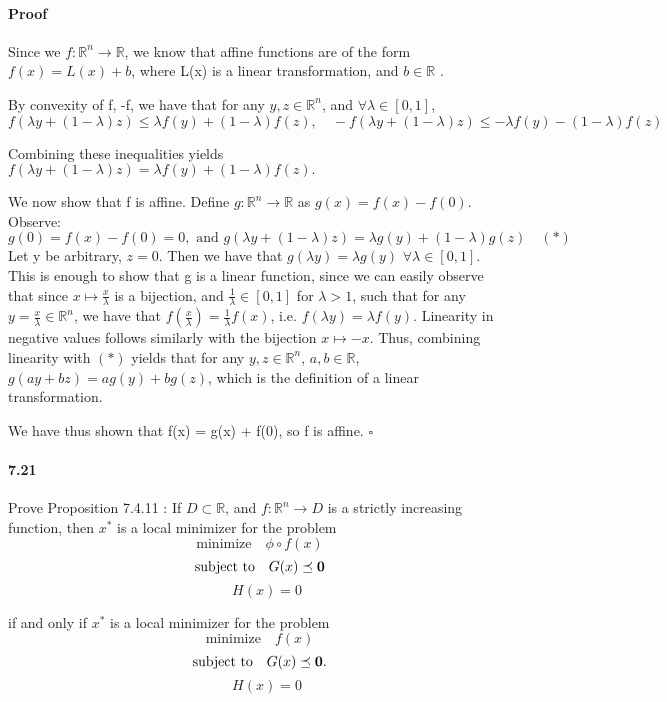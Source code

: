 \documentclass[letterpaper,12pt]{article}
\theoremstyle{definition}
\begin{document}
\paragraph{Proof} Since we $f: \mathbb{R}^n \rightarrow \mathbb{R}$, we know that affine functions are of the form $f(x) = L(x) + b $, where L(x) is a linear transformation, and $ b \in \mathbb{R}$ .

By convexity of f, -f, we have that for any $y, z \in \mathbb{R}^n$, and $\forall \lambda \in [0,1]$,  $$f(\lambda y + (1 - \lambda) z) \le \lambda f(y) + (1 - \lambda) f(z), \quad -f(\lambda y + (1 - \lambda) z) \le -\lambda f(y) - (1 - \lambda) f(z)$$

Combining these inequalities yields $f(\lambda y + (1 - \lambda) z) = \lambda f(y) + (1 - \lambda) f(z).$ 

We now show that f is affine. Define $g: \mathbb{R}^n \rightarrow \mathbb{R}$ as $ g(x) = f(x) - f(0)$. Observe:
$$g(0) = f(x) - f(0) = 0,\text{ and } g(\lambda y + (1 - \lambda) z) = \lambda g(y) + (1 - \lambda) g(z) \quad (*) $$
Let y be arbitrary, $z = 0$. Then we have that $g(\lambda y) = \lambda g(y)$ $\forall \lambda \in [0,1]$. This is enough to show that g is a linear function, since we can easily observe that since $x \mapsto \frac{x}{\lambda}$ is a bijection, and $\frac{1}{\lambda} \in [0,1]$ for $\lambda > 1$, such that for any $y = \frac{x}{\lambda} \in \mathbb{R}^n$, we have that $ f(\frac{x}{\lambda}) = \frac{1}{\lambda} f(x)$, i.e. $f(\lambda y) = \lambda f(y)$. Linearity in negative values follows similarly with the bijection $x \mapsto - x$.
Thus, combining linearity with $(*)$ yields that for any $y, z \in \mathbb{R}^n$, $a, b \in \mathbb{R}$, $g(ay + bz) = a g(y) + b g(z)$, which is the definition of a linear transformation.

We have thus shown that f(x) = g(x) + f(0), so f is affine. $\square$

\paragraph{7.21} Prove Proposition 7.4.11 : If $D \subset \mathbb{R}$, and $f: \mathbb{R}^n \rightarrow D$ is a strictly increasing function, then $x^*$ is a local minimizer for the problem 
$$ \text{minimize} \quad  \phi \circ f(x)$$
$$ \text{subject to} \quad  G(x)  \preceq \bf 0 $$
$$ \quad H(x) =  0 $$

if and only if $x^*$ is a local minimizer for the problem
$$ \text{minimize} \quad  f(x)$$
$$ \text{subject to} \quad  G(x)  \preceq \bf 0 .$$
$$ \quad H(x) =  0 $$
\end{document}
